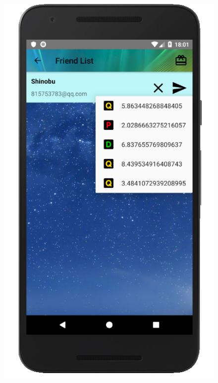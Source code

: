 \documentclass[12pt]{article}
\begin{document}
\begin{figure}
	\includegraphics[scale=0.25]{FriendCoin.png}

\end{figure}
\end{document}
